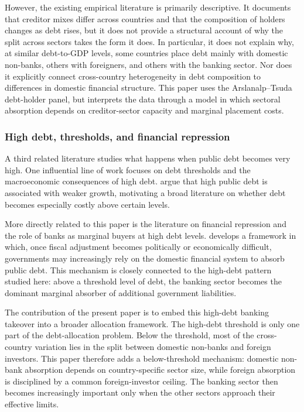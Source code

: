 \documentclass[\latexroot/\projectname]{subfiles}
\begin{document}
However, the existing empirical literature is primarily descriptive.
It documents that creditor mixes differ across countries and that the composition of holders changes as debt rises, but it does not provide a structural account of why the split across sectors takes the form it does.
In particular, it does not explain why, at similar debt-to-GDP levels, some countries place debt mainly with domestic non-banks, others with foreigners, and others with the banking sector.
Nor does it explicitly connect cross-country heterogeneity in debt composition to differences in domestic financial structure.
This paper uses the Arslanalp--Tsuda debt-holder panel, but interprets the data through a model in which sectoral absorption depends on creditor-sector capacity and marginal placement costs.

\subsubsection{High debt, thresholds, and financial repression}
\whenintegrated{\label{lit-high-debt-repression}}

A third related literature studies what happens when public debt becomes very high.
One influential line of work focuses on debt thresholds and the macroeconomic consequences of high debt.
\citet{ReinhartRogoff2010} argue that high public debt is associated with weaker growth, motivating a broad literature on whether debt becomes especially costly above certain levels.

More directly related to this paper is the literature on financial repression and the role of banks as marginal buyers at high debt levels.
\citet{Jeanne2025} develops a framework in which, once fiscal adjustment becomes politically or economically difficult, governments may increasingly rely on the domestic financial system to absorb public debt.
This mechanism is closely connected to the high-debt pattern studied here: above a threshold level of debt, the banking sector becomes the dominant marginal absorber of additional government liabilities.

The contribution of the present paper is to embed this high-debt banking takeover into a broader allocation framework.
The high-debt threshold is only one part of the debt-allocation problem.
Below the threshold, most of the cross-country variation lies in the split between domestic non-banks and foreign investors.
This paper therefore adds a below-threshold mechanism: domestic non-bank absorption depends on country-specific sector size, while foreign absorption is disciplined by a common foreign-investor ceiling.
The banking sector then becomes increasingly important only when the other sectors approach their effective limits.
\end{document}
